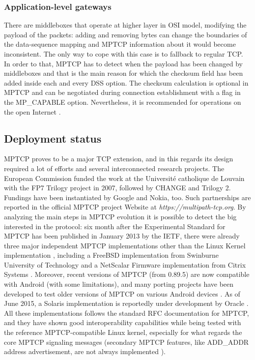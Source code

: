 \subsubsection{Application-level gateways}
There are middleboxes that operate at higher layer in OSI model, modifying the payload of the packets: adding and removing bytes can change the boundaries of the data-sequence mapping and MPTCP information about it would become inconsistent. The only way to cope with this case is to fallback to regular TCP. In order to that, MPTCP has to detect when the payload has been changed by middleboxes and that is the main reason for which the checksum field has been added inside each and every DSS option. The checksum calculation is optional in MPTCP and can be negotiated during connection establishment with a flag in the MP\_CAPABLE option. Nevertheless, it is recommended for operations on the open Internet \cite{HDPDB13}.

\subsection{Deployment status}
MPTCP proves to be a major TCP extension, and in this regards its design required a lot of efforts and several interconnected research projects. The European Commission funded the work at the Université catholique de Louvain with the FP7 Trilogy project in 2007, followed by CHANGE and Trilogy 2. Fundings have been instantiated by Google and Nokia, too. Such partnerships are reported in the official MPTCP project Website at \textit{https://multipath-tcp.org}.
By analyzing the main steps in MPTCP evolution it is possible to detect the big interested in the protocol: six month after the Experimental Standard for MPTCP has been published in January 2013 by the IETF, there were already three major independent MPTCP implementations other than the Linux Kernel implementation \cite{eardley-mptcp-implementations-survey-02}, including a FreeBSD implementation from Swinburne University of Technology \cite{caia} and a NetScalar Firmware implementation from Citrix Systems \cite{netscalar}.
Moreover, recent versions of MPTCP (from 0.89.5) are now compatible with Android (with some limitations), and many porting projects have been developed to test older versions of MPTCP on various Android devices \cite{mptcpandroid}.
As of June 2015, a Solaris implementation is reportedly under development by Oracle \cite{mptcpsolaris}.
All these implementations follows the standard RFC documentation for MPTCP, and they have shown good interoperability capabilities while being tested with the reference MPTCP-compatible Linux kernel, especially for what regards the core MPTCP signaling messages (secondary MPTCP features, like ADD\_ADDR address advertisement, are not always implemented \cite{eardley-mptcp-implementations-survey-02}).

